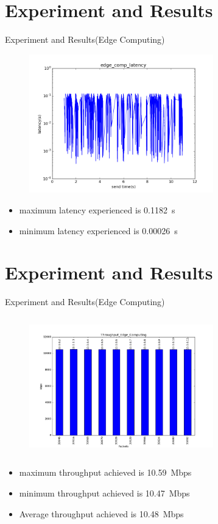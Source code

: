\documentclass{beamer}
\begin{document}
\section{Experiment and Results}
\begin{frame}{Experiment and Results\big(Edge Computing\big)}
\begin{figure}
\includegraphics[width=8cm, height=6cm]{edgecomp_26}
\centering
\end{figure}
\begin{itemize}
	\item maximum latency experienced is \SI{.1182}{\second}
	\item minimum latency experienced is \SI{.00026}{\second} 
\end{itemize}

\end{frame}
\section{Experiment and Results}
\begin{frame}{Experiment and Results\big(Edge Computing\big)}
\begin{figure}
\includegraphics[width=8cm, height=6cm]{edgecompthrough}
\centering
\end{figure}
\begin{itemize}

	\item maximum throughput achieved is \SI{10.59}Mbps
	\item minimum throughput achieved is \SI{10.47}Mbps
	\item Average throughput achieved is \SI{10.48}Mbps
\end{itemize}

\end{frame}
\end{document}
